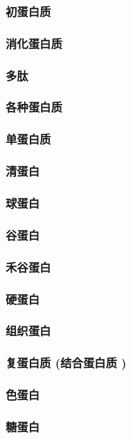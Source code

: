 \documentclass[UTF8]{../../ApplicationUniverse}
\begin{document}
            \subsubsection{初蛋白质}
            \subsubsection{消化蛋白质}
            \subsubsection{多肽}
        \subsubsection{各种蛋白质}
            \subsubsection{单蛋白质}
                \subsubsection{清蛋白}
                \subsubsection{球蛋白}
                \subsubsection{谷蛋白}
                \subsubsection{禾谷蛋白}
                \subsubsection{硬蛋白}
                \subsubsection{组织蛋白}
            \subsubsection{复蛋白质 (结合蛋白质 )}
                \subsubsection{色蛋白}
                \subsubsection{糖蛋白}
\end{document}
